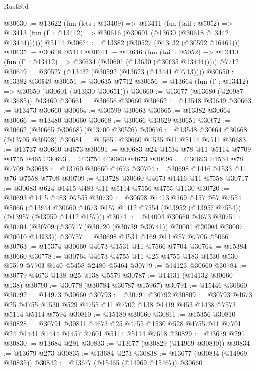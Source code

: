 \begin{lexlean}{RustStd}
\begin{coremodule}
@30630 := @13622
    (fun (lets : @13409) =>
    @13411
      (fun (tail : @5052) =>
      @13413 (fun (Γ : @13412) => @30616 (@30601 (@13630 (@30618 @13442 @13444))))))
    @5114
@30634 := @13382 (@30527 (@13432 (@30592 @16461)))
@30635 := @30618 @5114
@30644 := @13646
    (fun (tail : @5052) => @13413 (fun (Γ : @13412) => @30634 (@30601 (@13630 (@30635 @13444)))))
    @7712
@30649 := @30527 (@13432 (@30592 (@13623 (@13441 @7713))))
@30650 := @13382 @30649
@30651 := @30635 @7712
@30656 := @13664 (fun (Γ : @13412) => @30650 (@30601 (@13630 @30651)))
@30660 := @13677 (@13680 (@20987 @13685)) @13460
@30661 := @30656 @30660
@30662 := @13548 @30649
@30663 := @13473 @30660
@30664 := @30599 @30663
@30665 := @13382 @30664
@30666 := @13480 @30660
@30668 := @30666 @13629 @30651
@30672 := @30662 (@30665 @30668) (@13700 @30526)
@30676 := @13548 @30664 @30668 (@13705 @30598)
@30681 := @15651 @30660 @1535 @11 @5114 @7711
@30683 := @13737 @30660 @4673
@30691 := @30683 @24 @1534 @78 @11 @5114 @7709 @4755 @465
@30693 := @13751 @30660 @4673
@30696 := @30693 @1534 @78 @7709
@30698 := @13760 @30660 @4673
@30704 := @30698 @1416 @1533 @11 @76 @7558 @7708
@30709 := @13728 @30660 @4673 @1416 @11 @7558
@30717 := @30683 @624 @1415 @483 @11 @5114 @7556 @4755 @1130
@30720 := @30693 @1415 @483 @7556
@30739 := @30698
    @1413
    @169
    @157
    @57
    @7554
    @5066
    (@13944 @30660 @4673 @157 @1412 @7554 (@13952 (@13953 @7554)) (@13957 (@13959 @1412 @157)))
@30741 := @14004 @30660 @4673
@30751 := @30704 (@30709 (@30717 (@30720 (@30739 @30741)) @20001 @20004 @20007 @20010 @14033))
@30757 := @30698 @1531 @169 @11 @57 @7706 @5066
@30763 := @15374 @30660 @4673 @1531 @11 @7566 @7704
@30764 := @15384 @30660
@30778 := @30764 @4673 @4755 @11 @25 @4755 @183 @1530 @530 @5579 @7703 @140 @5458 @2480 @5464
@30779 := @14123 @30660
@30784 := @30779 @4673 @138 @25 @138 @5579
@30787 := @14131 (@14132 @30660 @138)
@30790 := @30778 (@30784 @30787 @15967)
@30791 := @15446 @30660
@30792 := @14973 @30660
@30793 := @30791 @30792
@30809 := @30793
    @4673
    @25
    @4755
    @1530
    @529
    @4755
    @11
    @7702
    @138
    @1419
    @453
    @1438
    @7573
    @5114
    @5114
    @7594
@30810 := @15180 @30660
@30811 := @15356 @30810
@30828 := @30791
    @30811
    @4673
    @25
    @4755
    @1530
    @528
    @4755
    @11
    @7701
    @24
    @1441
    @1444
    @1457
    @7601
    @5114
    @5114
    @7618
@30829 := @13679 @291
@30830 := @13684 @291
@30833 := @13677 (@30829 (@14969 @30830))
@30834 := @13679 @273
@30835 := @13684 @273
@30838 := @13677 (@30834 (@14969 @30835))
@30842 := @13677 (@15465 (@14969 @15467)) @30660

\end{coremodule}
\end{lexlean}
